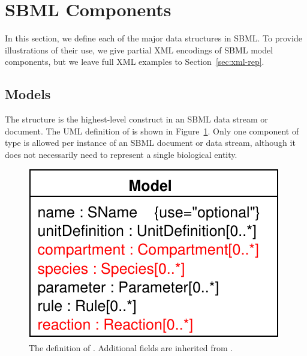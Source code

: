 \documentclass[10pt]{cekarticle}
\newcommand{\vref}[1]{\ref{#1}}
\begin{document}




\section{SBML Components}
\label{sec:elements}

In this section, we define each of the major data structures in SBML.  To
provide illustrations of their use, we give partial XML encodings of SBML
model components, but we leave full XML examples to
Section~\ref{sec:xml-rep}.


\subsection{Models}
\label{sec:model}

The  structure is the highest-level construct in an SBML data
stream or document.  The UML definition of  is shown in
Figure~\vref{fig:model}.  Only one component of type  is
allowed per instance of an SBML document or data stream, although it does
not necessarily need to represent a single biological entity.

\begin{figure}[htb]
  \centering
  \includegraphics[scale = 0.65]{figs/model}
  \caption{The definition of .  Additional fields are
    inherited from .}
  \vspace*{-0.7ex}
  \label{fig:model}
\end{figure}
\end{document}
